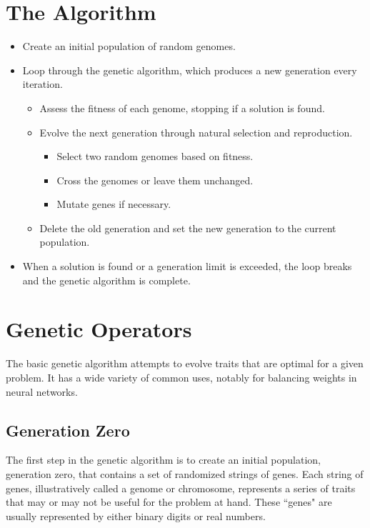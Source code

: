 \documentclass[12pt]{report}
\begin{document}
\section{The Algorithm}

\begin{itemize}
\item{Create an initial population of random genomes.}
\item{Loop through the genetic algorithm, which produces a new generation every iteration.}

\begin{itemize}
\item{Assess the fitness of each genome, stopping if a solution is found.}
\item{Evolve the next generation through natural selection and reproduction.}

\begin{itemize}
\item{Select two random genomes based on fitness.}
\item{Cross the genomes or leave them unchanged.}
\item{Mutate genes if necessary.}
\end{itemize}
             
\item{Delete the old generation and set the new generation to the current population.}
\end{itemize}
            
\item{When a solution is found or a generation limit is exceeded, the loop breaks and the genetic algorithm is complete.}

\end{itemize} 




\section{Genetic Operators}


The basic genetic algorithm attempts to evolve traits that are optimal for a given problem. It has a wide variety of common uses, notably for balancing weights in neural networks.


\subsection{Generation Zero}
The first step in the genetic algorithm is to create an initial population, generation zero, that contains a set of randomized strings of genes. Each string of genes, illustratively called a genome or chromosome, represents a series of traits that may or may not be useful for the problem at hand. These ``genes" are usually represented by either binary digits or real numbers.
\end{document}
